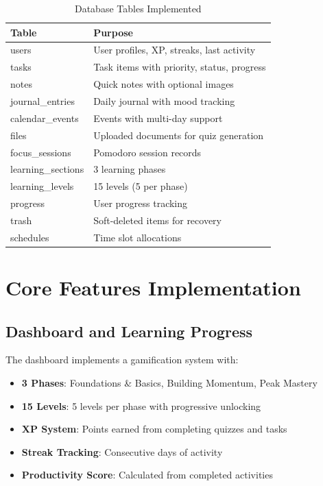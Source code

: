 \begin{table}[H]
\centering
\begin{tabular}{|l|p{8cm}|}
\hline
\textbf{Table} & \textbf{Purpose} \\
\hline
users & User profiles, XP, streaks, last activity \\
tasks & Task items with priority, status, progress \\
notes & Quick notes with optional images \\
journal\_entries & Daily journal with mood tracking \\
calendar\_events & Events with multi-day support \\
files & Uploaded documents for quiz generation \\
focus\_sessions & Pomodoro session records \\
learning\_sections & 3 learning phases \\
learning\_levels & 15 levels (5 per phase) \\
progress & User progress tracking \\
trash & Soft-deleted items for recovery \\
schedules & Time slot allocations \\
\hline
\end{tabular}
\caption{Database Tables Implemented}
\end{table}

\section{Core Features Implementation}

\subsection{Dashboard and Learning Progress}
The dashboard implements a gamification system with:
\begin{itemize}
    \item \textbf{3 Phases}: Foundations \& Basics, Building Momentum, Peak Mastery
    \item \textbf{15 Levels}: 5 levels per phase with progressive unlocking
    \item \textbf{XP System}: Points earned from completing quizzes and tasks
    \item \textbf{Streak Tracking}: Consecutive days of activity
    \item \textbf{Productivity Score}: Calculated from completed activities
\end{itemize}

